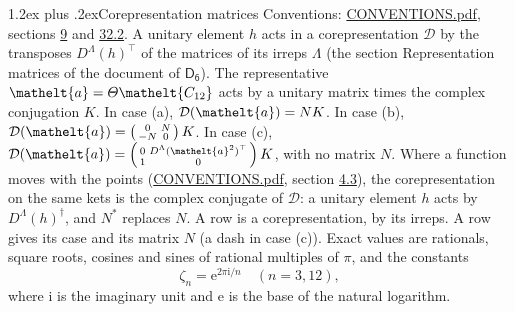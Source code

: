\documentclass[10pt,a4paper]{article}
\makeatletter
\renewcommand\section{\@startsection{section}{1}{\z@}{-3ex plus -1ex minus -.2ex}%
  {1.2ex plus .2ex}{\normalfont\large\sffamily\bfseries\color{parttitle}}}
\numberwithin{equation}{section}
\newcommand{\eltfont}[1]{{\let\sigma\eltsigma\mathelt{#1}}}
\newcommand{\grp}[1]{\mathsf{#1}}
\newcommand{\elt}[1]{\eltfont{#1}}
\newcommand{\iunit}{\mathrm{i}}
\newcommand{\expe}{\mathrm{e}}
\newcommand{\rootunity}[1]{\zeta_{#1}}
\makeatother
\begin{document}
\section{Corepresentation matrices}\label{s:corep_matrices}
Conventions: \href{../../CONVENTIONS.pdf}{CONVENTIONS.pdf}, sections \href{../../../rotation/CONVENTIONS.pdf\#conv.9}{9} and \href{../../CONVENTIONS.pdf\#conv.32.2}{32.2}.
A unitary element $h$ acts in a corepresentation $\mathcal{D}$ by the transposes $D^{\Lambda}(h)^{\top}$ of the matrices of its irreps $\Lambda$ (the section Representation matrices of the document of \href{../../../rotation/data/pdf/D6.pdf}{$\grp{D_{6}}$}). The representative $\elt{a} = \varTheta\elt{C_{12}}$ acts by a unitary matrix times the complex conjugation $K$.
In case (a), $\mathcal{D}(\elt{a}) = NK$. In case (b), $\mathcal{D}(\elt{a}) = \left(\begin{smallmatrix} 0 & N \\ -N & 0 \end{smallmatrix}\right) K$. In case (c), $\mathcal{D}(\elt{a}) = \left(\begin{smallmatrix} 0 & D^{\Lambda}(\elt{a}^2)^{\top} \\ 1 & 0 \end{smallmatrix}\right) K$, with no matrix $N$.
Where a function moves with the points (\href{../../CONVENTIONS.pdf}{CONVENTIONS.pdf}, section \href{../../../rotation/CONVENTIONS.pdf\#conv.4.3}{4.3}), the corepresentation on the same kets is the complex conjugate of $\mathcal{D}$: a unitary element $h$ acts by $D^{\Lambda}(h)^{\dagger}$, and $N^{*}$ replaces $N$.
A row is a corepresentation, by its irreps. A row gives its case and its matrix $N$ (a dash in case (c)).
\leavevmode\label{n:constant.root}\label{n:index.root.order}Exact values are rationals, square roots, cosines and sines of rational multiples of $\pi$, and the constants
\begin{equation}\label{e:constants}\rootunity{n} = \expe^{2\pi\iunit/n}\quad(n = 3, 12),\end{equation}
where $\iunit$ is the imaginary unit and $\expe$ is the base of the natural logarithm.
\end{document}
